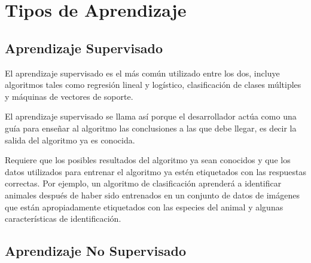\documentclass[12pt, runningheads,a4]{book}
\begin{document}
\section{Tipos de Aprendizaje}

	\subsection{Aprendizaje Supervisado}

El aprendizaje supervisado es el más común utilizado entre los dos, incluye algoritmos tales como regresión lineal y logístico, clasificación de clases múltiples y máquinas de vectores de soporte.

El aprendizaje supervisado se llama así porque el desarrollador actúa como una guía para enseñar al algoritmo las conclusiones a las que debe llegar, es decir la salida del algoritmo ya es conocida. 

Requiere que los posibles resultados del algoritmo ya sean conocidos y que los datos utilizados para entrenar el algoritmo ya estén etiquetados con las respuestas correctas. Por ejemplo, un algoritmo de clasificación aprenderá a identificar animales después de haber sido entrenados en un conjunto de datos de imágenes que están apropiadamente etiquetados con las especies del animal y algunas características de identificación.



	\subsection{Aprendizaje No Supervisado}
\end{document}
